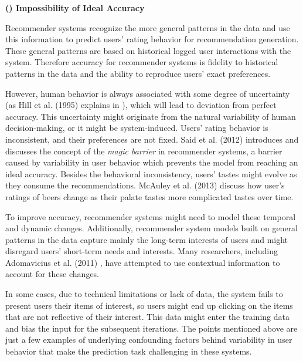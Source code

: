 \vspace{0.25cm}
\noindent \textbf{() Impossibility of Ideal Accuracy}
\vspace{0.25cm}

Recommender systems recognize the more general patterns in the data and use this information to predict users' rating behavior for recommendation generation. These general patterns are based on historical logged user interactions with the system. Therefore accuracy for recommender systems is fidelity to historical patterns in the data and the ability to reproduce users' exact preferences. 

However, human behavior is always associated with some degree of uncertainty (as Hill et al. (1995) explains in \cite{hill1995recommending}), which will lead to deviation from perfect accuracy. This uncertainty might originate from the natural variability of human decision-making, or it might be system-induced. Users' rating behavior is inconsistent, and their preferences are not fixed. Said et al. (2012) \cite{Said2012MagicBarrier} introduces and discusses the concept of the \textit{magic barrier} in recommender systems, a barrier caused by variability in user behavior which prevents the model from reaching an ideal accuracy. Besides the behavioral inconsistency, users' tastes might evolve as they consume the recommendations. McAuley et al. (2013) \cite{McAuley2013expertise} discuss how user's ratings of beers change as their palate tastes more complicated tastes over time. 




To improve accuracy, recommender systems might need to model these temporal and dynamic changes. Additionally, recommender system models built on general patterns in the data capture mainly the long-term interests of users and might disregard users' short-term needs and interests. Many researchers, including Adomavicius et al. (2011) \cite{Adomavicius2011context}, have attempted to use contextual information to account for these changes.

In some cases, due to technical limitations or lack of data, the system fails to present users their items of interest, so users might end up clicking on the items that are not reflective of their interest. This data might enter the training data and bias the input for the subsequent iterations. The points mentioned above are just a few examples of underlying confounding factors behind variability in user behavior that make the prediction task challenging in these systems.


